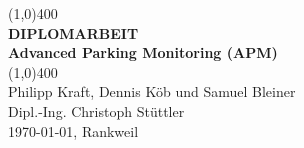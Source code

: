 
\begin{center}
  \vspace*{1cm}
  \line(1,0){400}\\[1mm]
  \huge{\textbf{DIPLOMARBEIT}}\\[2mm]
  \large{\textbf{Advanced Parking Monitoring (APM)}}\\[1mm]
  \line(1,0){400}\\[2cm]
  Philipp Kraft, Dennis Köb und Samuel Bleiner\\[2mm]
  Dipl.-Ing. Christoph Stüttler \\[5mm]
  \today, Rankweil
  \vfill
\end{center}

